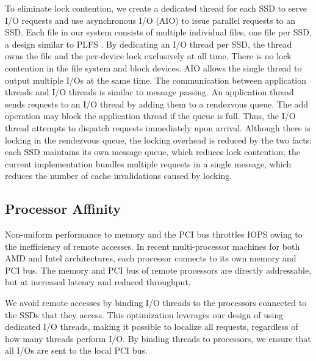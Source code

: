 To eliminate lock contention, we create a dedicated thread
for each SSD to serve I/O requests and use asynchronous I/O (AIO)
to issue parallel requests to an SSD.
Each file in our system consists of multiple individual 
files, one file per SSD, a design similar to PLFS \cite{plfs}.
By dedicating an I/O thread per SSD, the thread
owns the file and the per-device lock exclusively at all time.
There is no lock contention in the file system and block devices.
AIO allows the single thread to output multiple I/Os at the same time.
The communication between application threads and I/O threads is
similar to message passing. An application thread sends requests to an I/O 
thread by adding them to a rendezvous queue. The add operation
may block the application thread if the queue is full. Thus, the 
I/O thread attempts to dispatch requests immediately upon arrival. 
Although there is locking in the rendezvous queue, the locking overhead
is reduced by the two facts: each SSD maintains its own message queue,
which reduces lock contention; the current implementation bundles
multiple requests in a single message, which reduces the number of
cache invalidations caused by locking.

\subsection{Processor Affinity}

Non-uniform performance to memory and the PCI bus throttles IOPS
owing to the inefficiency of remote accesses.
In recent multi-processor machines for both AMD and Intel architectures,
each processor connects to its own memory and PCI bus.  The memory and
PCI bus of remote processors are directly addressable, but at increased
latency and reduced throughput. 

We avoid remote accesses by binding I/O threads to the processors 
connected to the SSDs that they access.
This optimization leverages our 
design of using dedicated I/O threads, making it possible to localize all 
requests, regardless of how many threads perform I/O.  
By binding threads to processors, we ensure that all I/Os are sent to the 
local PCI bus.

